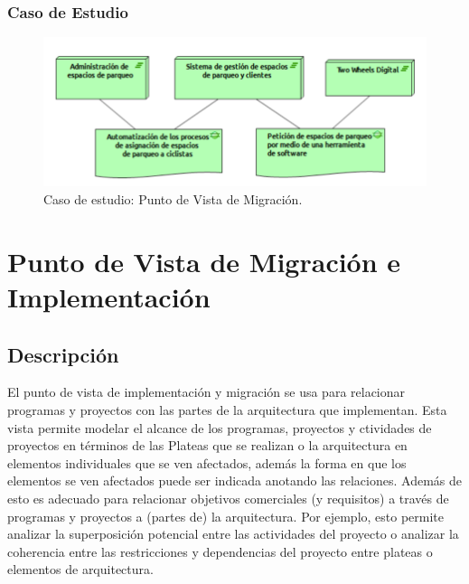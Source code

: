 \subsubsection{Caso de Estudio}


\begin{figure}[h]
	\centering
	\includegraphics[width=1.0\textwidth]{imagenes/Caso_Estudio/Migracion/Migracion.PDF}
	\caption{Caso de estudio: Punto de Vista de Migración.}
	\label{fig:gap_analysis}
\end{figure}

\section{Punto de Vista de Migración e Implementación}

\subsection{Descripción}
El punto de vista de implementación y migración se usa para relacionar programas y proyectos con las partes de la arquitectura que implementan. Esta vista permite modelar el alcance de los programas, proyectos y ctividades de proyectos en términos de las Plateas que se realizan o la arquitectura en elementos individuales que se ven afectados, además la forma en que los elementos se ven afectados puede ser indicada anotando las relaciones.
Además  de esto es adecuado para relacionar objetivos comerciales (y requisitos) a través de programas y proyectos a (partes de) la arquitectura. Por ejemplo, esto permite analizar la superposición potencial entre las actividades del proyecto o analizar la coherencia entre las restricciones y dependencias del proyecto entre plateas o elementos de arquitectura.


